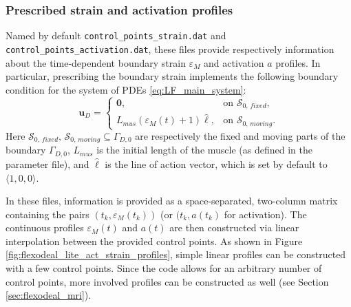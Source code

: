 \documentclass{sfuthesis}
\numberwithin{equation}{section}
\numberwithin{figure}{chapter}
\numberwithin{table}{chapter}
\theoremstyle{definition}
\def\*#1{{\mathbf{#1}}} %
\begin{document}
\subsubsection{Prescribed strain and activation profiles} \label{sec:prescribed_act_strain}

Named by default \texttt{control\_points\_strain.dat} and \texttt{control\_points\_activation.dat}, these files provide respectively information about the time-dependent boundary strain $\varepsilon_M$ and activation $a$ profiles. In particular, prescribing the boundary strain implements the following boundary condition for the system of PDEs \eqref{eq:LF_main_system}:
\begin{equation}
    \*u_D = \left\{ \begin{array}{ll}
        \*0, & \text{on } \mathcal{S}_{0,\, fixed}, \\
        L_{mus} \left( \varepsilon_M(t) + 1 \right) \widehat{\bm{\ell}}, & \text{on } \mathcal{S}_{0,\, moving}.
    \end{array}\right.
\end{equation}
Here $\mathcal{S}_{0,\, fixed}, \, \mathcal{S}_{0,\, moving}  \subseteq \Gamma_{D,0}$ are respectively the fixed and moving parts of the boundary $\Gamma_{D,0}$, $L_{mus}$ is the initial length of the muscle (as defined in the parameter file), and $\widehat{\bm{\ell}}$ is the line of action vector,  which is set by default to $\langle 1,0,0 \rangle$.

In these files, information is provided as a space-separated, two-column matrix containing the pairs $(t_k, \varepsilon_M(t_k))$ (or $(t_k, a(t_k)$ for activation). The continuous profiles $\varepsilon_M(t)$ and $a(t)$ are then constructed via linear interpolation between the provided control points. As shown in Figure \ref{fig:flexodeal_lite_act_strain_profiles}, simple linear profiles can be constructed with a few control points. Since the code allows for an arbitrary number of control points, more involved profiles can be constructed as well (see Section \ref{sec:flexodeal_mri}).
\end{document}

